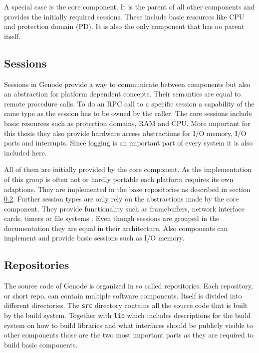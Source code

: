 \documentclass[
a4paper,
12pt,
notitlepage,
parskip=half,
DIV=11,
]{scrbook}
\begin{document}
		A special case is the core component.
		It is the parent of all other components and provides the initially required sessions.
		These include basic resources like CPU and protection domain  (PD).
		It is also the only component that has no parent itself. \citep{genode}
		
		\subsection{Sessions}
		\label{sessions}
		
		Sessions in Genode provide a way to communicate between components but also an abstraction for platform dependent concepts.
		Their semantics are equal to remote procedure calls.
		To do an RPC call to a specific session a capability of the same type as the session has to be owned by the caller.
		The core sessions include basic resources such as protection domains, RAM and CPU.
		More important for this thesis they also provide hardware access abstractions for I/O memory, I/O ports and interrupts.
		Since logging is an important part of every system it is also included here.
		
		All of them are initially provided by the core component.
		As the implementation of this group is often not or hardly portable each platform requires its own adaptions.
		They are implemented in the base repositories as described in section \ref{repos}.
		Further session types are only rely on the abstractions made by the core component.
		They provide functionality such as framebuffers, network interface cards, timers or file systems \citep{genode}.
		Even though sessions are grouped in the documentation they are equal in their architecture.
		Also components can implement and provide basic sessions such as I/O memory.
		
		\subsection{Repositories}
		\label{repos}
		
		The source code of Genode is organized in so called repositories.
		Each repository, or short repo, can contain multiple software components.
		Itself is divided into different directories.
		The \texttt{src} directory contains all the source code that is built by the build system.
		Together with \texttt{lib} which includes descriptions for the build system on how to build libraries and what interfaces should be publicly visible to other components those are the two most important parts as they are required to build basic components.
		
\end{document}
